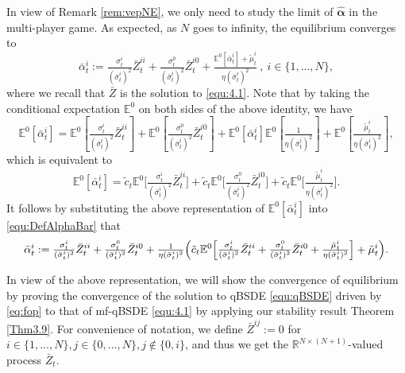 \documentclass[10pt,a4paper]{article}
\newcommand{\E}{\mathbb{E}}
\newcommand{\be}{\begin{equation}}
\newcommand{\ee}{\end{equation}}
\newcommand{\Balpha}{\boldsymbol{\alpha}}
\newcommand{\hBalpha}{\hat{\Balpha}}
\theoremstyle{plain}
\theoremstyle{definition}
\numberwithin{equation}{section}
\begin{document}
In view of Remark \ref{rem:vepNE}, we only need to study the limit of $\hBalpha$ in the multi-player game.
As expected, as $N$ goes to infinity, the equilibrium converges to 
\begin{equation}
\label{equ:DefAlphaBar}
\bar{\alpha}_{t}^{i} := \tfrac{\sigma_{t}^{i}}{(\bar{\sigma}_{t}^{i})^{2}}\bar{Z}_{t}^{ii} + \tfrac{\sigma_{t}^{0}}{(\bar{\sigma}_{t}^{i})^{2}}\bar{Z}_{t}^{i0} + \tfrac{\mathds{E}^{0}[\bar{\alpha}_{t}^{i}]+\tilde{\mu}_{t}^{i}}{\eta(\bar{\sigma}_{t}^{i})^{2}} \ , \ i \in \{1,...,N\},
\end{equation}
where we recall that $\bar Z$ is the solution to \eqref{equ:4.1}. Note that by taking the conditional expectation $\E^0$ on both sides of the above identity, we have
\[
\mathds{E}^{0}[\bar{\alpha}_{t}^{i}] = \mathds{E}^{0}[\tfrac{\sigma_{t}^{i}}{(\bar{\sigma}_{t}^{i})^{2}}\bar{Z}_{t}^{ii}] + \mathds{E}^{0}[\tfrac{\sigma_{t}^{0}}{(\bar{\sigma}_{t}^{i})^{2}}\bar{Z}_{t}^{i0}] + \mathds{E}^{0}[\bar{\alpha}_{t}^{i}]\mathds{E}^{0}[\tfrac{1}{\eta(\bar{\sigma}_{t}^{i})^{2}}] + \mathds{E}^{0}[\tfrac{\tilde{\mu}_{t}^{i}}{\eta(\bar{\sigma}_{t}^{i})^{2}}],
\]
which is equivalent to
\begin{equation}
\label{equ:2.41}
\mathds{E}^{0}[\bar{\alpha}_{t}^{i}] = \tilde{c}_{t}\mathds{E}^{0}\bigl[\tfrac{\sigma_{t}^{i}}{(\bar{\sigma}_{t}^{i})^{2}}\bar{Z}_{t}^{ii}\bigr] + \tilde{c}_{t}\mathds{E}^{0}\bigl[\tfrac{\sigma_{t}^{0}}{(\bar{\sigma}_{t}^{i})^{2}}\bar{Z}_{t}^{i0}\bigr] + \tilde{c}_{t}\mathds{E}^{0}\bigl[\tfrac{\tilde{\mu}_{t}^{i}}{\eta(\bar{\sigma}_{t}^{i})^{2}}\bigr].
\end{equation}
It follows by substituting the above representation of $\mathds{E}^{0}[\bar{\alpha}_{t}^{i}]$ into \eqref{equ:DefAlphaBar} that 
\be\label{eq:fulalbar}
\bar{\alpha}_{t}^{i} := \tfrac{\sigma_{t}^{i}}{(\bar{\sigma}_{t}^{i})^{2}}\bar{Z}_{t}^{ii} + \tfrac{\sigma_{t}^{0}}{(\bar{\sigma}_{t}^{i})^{2}}\bar{Z}_{t}^{i0}+\tfrac{1}{\eta (\bar{\sigma}_{t}^{i})^{2}} \Bigl(\tilde{c}_t \E^{0}\Bigl[\tfrac{\sigma_{t}^{i}}{(\bar{\sigma}_{t}^{i})^{2}}\bar{Z}_{t}^{ii} + \tfrac{\sigma_{t}^{0}}{(\bar{\sigma}_{t}^{i})^{2}}\bar{Z}_{t}^{i0} + \tfrac{\tilde{\mu}_{t}^{i}}{\eta(\bar{\sigma}_{t}^{i})^{2} } \Bigr]  + \tilde{\mu}^i_t \Bigr).
\ee


In view of the above representation, we will show the convergence of equilibrium by proving the convergence of the solution to qBSDE \eqref{equ:qBSDE} driven by \eqref{eq:fop} to that of mf-qBSDE \eqref{equ:4.1} by applying our stability result Theorem \ref{Thm3.9}.
For convenience of notation, we define $\bar{Z}^{ij} := 0$ for $i \in \{1,...,N\}, j \in \{0,...,N\}, j \notin \{0,i\}$, and thus we get the $\mathbb{R}^{N \times (N+1)}$-valued process $\bar{Z}_{t}$. 
\end{document}
